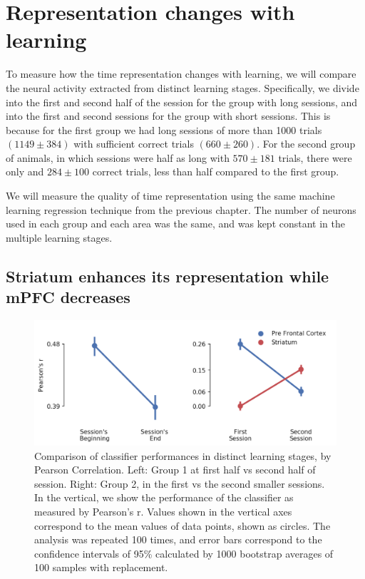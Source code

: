 \chapter{Representation changes with learning}

To measure how the time representation changes with learning, we will compare the neural activity extracted from distinct learning stages. Specifically, we divide into the first and second half of the session for the group with long sessions, and into the first and second sessions for the group with short sessions. This is because for the first group we had long sessions of more than 1000 trials $(1149 \pm 384)$ with sufficient correct trials $(660 \pm 260)$. For the second group of animals, in which sessions were half as long with $570 \pm 181$ trials, there were only and $284\pm 100$ correct trials, less than half compared to the first group.

We will measure the quality of time representation using the same machine learning regression technique from the previous chapter. The number of neurons used in each group and each area was the same, and was kept constant in the multiple learning stages.

\section{Striatum enhances its representation while mPFC decreases}

\begin{figure}[ht]
    \centering
    \includegraphics[width=\textwidth]{figures/pearson_comparison_before_after_learning.png}
    \caption[Comparison of classifier performances in distinct learning stages, by Pearson Correlation]{Comparison of classifier performances in distinct learning stages, by Pearson Correlation. Left: Group 1 at first half vs second half of session. Right: Group 2, in the first vs the second smaller sessions. In the vertical, we show the performance of the classifier as measured by Pearson's r. Values shown in the vertical axes correspond to the mean values of data points, shown as circles. The analysis was repeated 100 times, and error bars correspond to the confidence intervals of 95\% calculated by 1000 bootstrap averages of 100 samples with replacement.}
    \label{fig:evolution_representation_pearson}
\end{figure}

